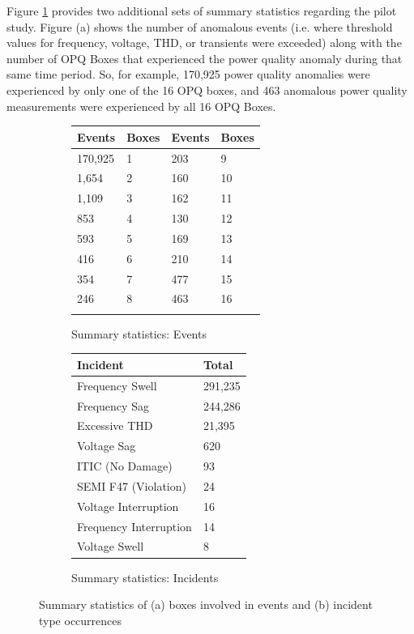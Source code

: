 Figure \ref{fig:statistics} provides two additional sets of summary statistics regarding the pilot study.  Figure (a) shows the number of anomalous events (i.e. where threshold values for frequency, voltage, THD, or transients were exceeded) along with the number of OPQ Boxes that experienced the power quality anomaly during that same time period. So, for example, 170,925 power quality anomalies were experienced by only one of the 16 OPQ boxes, and 463 anomalous power quality measurements were experienced by all 16 OPQ Boxes.

\begin{figure}[ht]
	\centering
	\begin{subfigure}{.5\textwidth}
        \begin{tabularx}{\textwidth}{XXXX|}
            \toprule
            \textbf{Events} & \textbf{Boxes} & \textbf{Events} & \textbf{Boxes} \\
            \midrule
            170,925 & 1 & 203 & 9 \\
            1,654 & 2 & 160 & 10 \\
            1,109 & 3 & 162 & 11 \\
            853 & 4 & 130 & 12 \\
            593 & 5 & 169 & 13 \\
            416 & 6 & 210 & 14 \\
            354 & 7 & 477 & 15 \\
            246 & 8 & 463 & 16 \\
             &  &  &  \\
            \bottomrule
        \end{tabularx}
	  \caption{Summary statistics: Events}
	\end{subfigure}%
	\begin{subfigure}{.5\textwidth}
	 \begin{tabularx}{\textwidth}{lX}
               \toprule
               \textbf{Incident} & \textbf{Total}  \\
               \midrule
               Frequency Swell & 291,235 \\
               Frequency Sag & 244,286  \\
               Excessive THD & 21,395 \\
               Voltage Sag & 620 \\
               ITIC (No Damage) & 93 \\
               SEMI F47 (Violation) & 24 \\
               Voltage Interruption & 16 \\
               Frequency Interruption & 14 \\
               Voltage Swell & 8 \\
               \bottomrule
           \end{tabularx}
   	  \caption{Summary statistics: Incidents}
	\end{subfigure}
	\caption{Summary statistics of (a) boxes involved in events and (b) incident type occurrences}
	\label{fig:statistics}
\end{figure}


